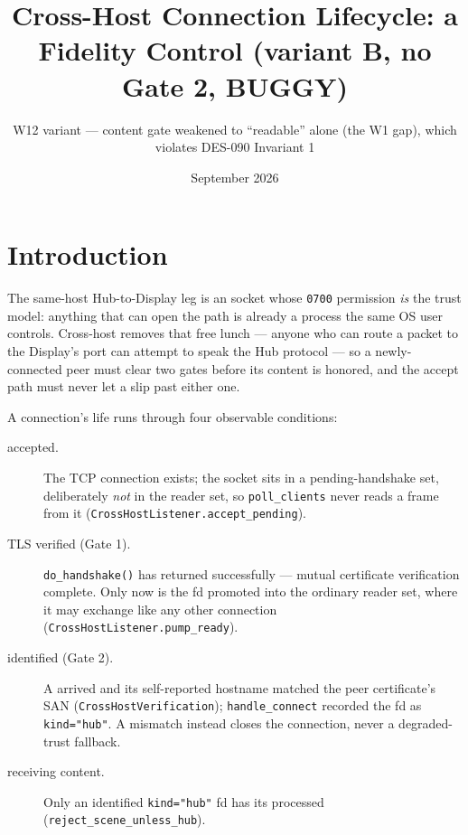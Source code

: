 \documentclass[a4paper,10pt,fleqn]{article}
\begin{document}
\title{Cross-Host Connection Lifecycle:
a Fidelity Control (variant B, no Gate 2, BUGGY)}
\author{W12 variant --- content gate weakened to ``readable'' alone (the
W1 gap), which violates DES-090 Invariant 1}
\date{September 2026}
\maketitle

\noindent{}
\vspace{1em}

\section{Introduction}

The same-host Hub-to-Display leg is an  socket whose
\texttt{0700} permission \emph{is} the trust model: anything that can open
the path is already a process the same OS user controls.  Cross-host
removes that free lunch --- anyone who can route a packet to the
Display's port can attempt to speak the Hub protocol --- so a
newly-connected peer must clear two gates before its content is honored,
and the accept path must never let a  slip past either
one.

A connection's life runs through four observable conditions:

\begin{description}
  \item[accepted.] The TCP connection exists; the socket sits in a
    pending-handshake set, deliberately \emph{not} in the reader set, so
    \texttt{poll\_clients} never reads a frame from it
    (\texttt{CrossHostListener.accept\_pending}).
  \item[TLS verified (Gate 1).] \texttt{do\_handshake()} has returned
    successfully --- mutual certificate verification complete.  Only now
    is the fd promoted into the ordinary reader set, where it may exchange
     like any other connection
    (\texttt{CrossHostListener.pump\_ready}).
  \item[identified (Gate 2).] A  arrived and its
    self-reported  hostname matched the peer certificate's
    SAN (\texttt{CrossHostVerification}); \texttt{handle\_connect}
    recorded the fd as \texttt{kind="hub"}.  A mismatch instead closes the
    connection, never a degraded-trust fallback.
  \item[receiving content.] Only an identified \texttt{kind="hub"} fd has
    its  processed (\texttt{reject\_scene\_unless\_hub}).
\end{description}
\end{document}
